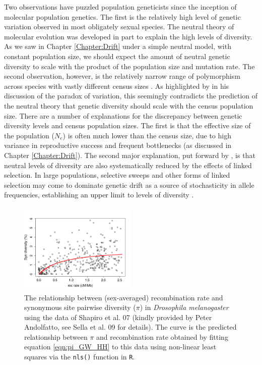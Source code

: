  Two observations have puzzled population geneticists since the
inception of molecular population genetics. The first is the relatively high
level of genetic variation observed in most obligately sexual species.  
The neutral theory of molecular evolution was developed in part to
explain the high levels of diversity. As we saw in Chapter \ref{Chapter:Drift} 
under a simple neutral model, with constant population size, we should expect the amount of neutral genetic
diversity to scale with the product of the population size and
mutation rate. The second observation, however, is the relatively narrow range 
of polymorphism across species with vastly different census sizes \citep[see ][ for a recent review]{Leffler:12}. 
As highlighted by \citet{Lewontin:74} in his discussion of the paradox
of variation, this seemingly contradicts the prediction of the neutral theory that
genetic diversity should scale with the census population size. There are a number of explanations for the discrepancy between genetic
diversity levels and census population sizes. The first is that the effective size of the population ($N_e$) is
often much lower than the census size, due to high variance in
reproductive success and frequent bottlenecks (as discussed in  Chapter \ref{Chapter:Drift}). 
The second major explanation, put forward by \citet{MaynardSmith:74},
is that neutral levels of diversity are also systematically reduced by the effects of linked selection. 
In large populations, selective sweeps and other forms of linked selection may come to dominate genetic drift as a
source of stochasticity in allele frequencies, establishing an upper limit to levels of diversity \citep{Kaplan:89, Gillespie:00}. 

\begin{figure}
\begin{center}
\includegraphics[width=0.5\textwidth]{figures/Genomewide_HH.png}
\end{center}
\caption{The relationship between (sex-averaged) recombination rate and synonymous
  site pairwise diversity ($\pi$) in {\it Drosophila melanogaster}
  using the data of Shapiro et al. 07 (kindly provided by Peter
  Andolfatto, see Sella et al. 09 for details). The curve is the
  predicted relationship between $\pi$ and recombination rate obtained
  by fitting equation \eqref{eqn:pi_GW_HH} to this data 
 using non-linear least squares via the {\tt nls()} function in {\tt R}.} \label{fig:GW_hitchhiking_reduction}
\end{figure}

